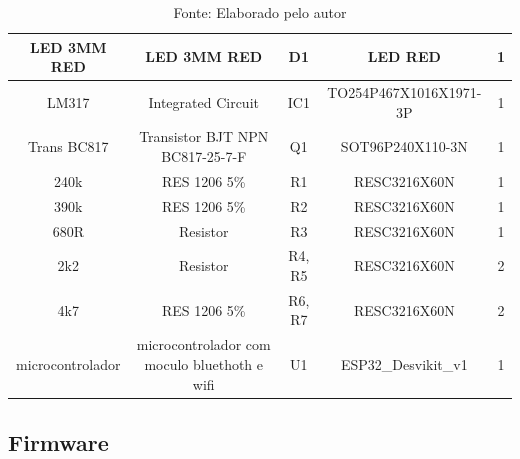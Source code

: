 \documentclass[../delivery_hospital_report.tex]{subfiles}
\begin{document}
\begin{table}[]
\begin{adjustbox}{width=\columnwidth,center}
\begin{tabular}{|c|c|c|c|c|}
LED 3MM RED          & LED 3MM RED                                                    & D1                                                                                                                       & LED RED                & 1        \\ \hline
LM317                & Integrated Circuit                                             & IC1                                                                                                                      & TO254P467X1016X1971-3P & 1        \\ \hline
Trans BC817          & Transistor BJT NPN   BC817-25-7-F                              & Q1                                                                                                                       & SOT96P240X110-3N       & 1        \\ \hline
240k                 & RES 1206 5\%                                                   & R1                                                                                                                       & RESC3216X60N           & 1        \\ \hline
390k                 & RES 1206 5\%                                                   & R2                                                                                                                       & RESC3216X60N           & 1        \\ \hline
680R                 & Resistor                                                       & R3                                                                                                                       & RESC3216X60N           & 1        \\ \hline
2k2                  & Resistor                                                       & R4, R5                                                                                                                   & RESC3216X60N           & 2        \\ \hline
4k7                  & RES 1206 5\%                                                   & R6, R7                                                                                                                   & RESC3216X60N           & 2        \\ \hline
microcontrolador     & microcontrolador com   moculo bluethoth e wifi                 & U1                                                                                                                       & ESP32\_Desvikit\_v1    & 1        \\ \hline

\end{tabular}
\end{adjustbox}
\centering
\caption*{Fonte: Elaborado pelo autor}
\label{table:voc}
\end{table}


\subsection{Firmware}
\end{document}
